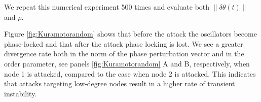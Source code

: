 \documentclass[%
 reprint,
 amsmath,amssymb,
 aip,
]{revtex4-2}
\def \bb {\pmb{b}}
\theoremstyle{italichead}
\theoremstyle{definition}
\begin{document}
{%
We repeat this numerical experiment 500 times and evaluate both $ \| \delta \theta(t) \|$ and $\rho$.

Figure \ref{fig:Kuramotorandom} shows that before the attack the oscillators become phase-locked and that after the attack phase locking is lost. 
We see a greater divergence rate both in the norm of the phase perturbation vector and in the order parameter, see panels \ref{fig:Kuramotorandom} A and B, respectively, when node 1 is attacked, compared to the case when node 2 is attacked.
This indicates that attacks targeting low-degree nodes result in a higher rate of transient instability.

}
\end{document}

